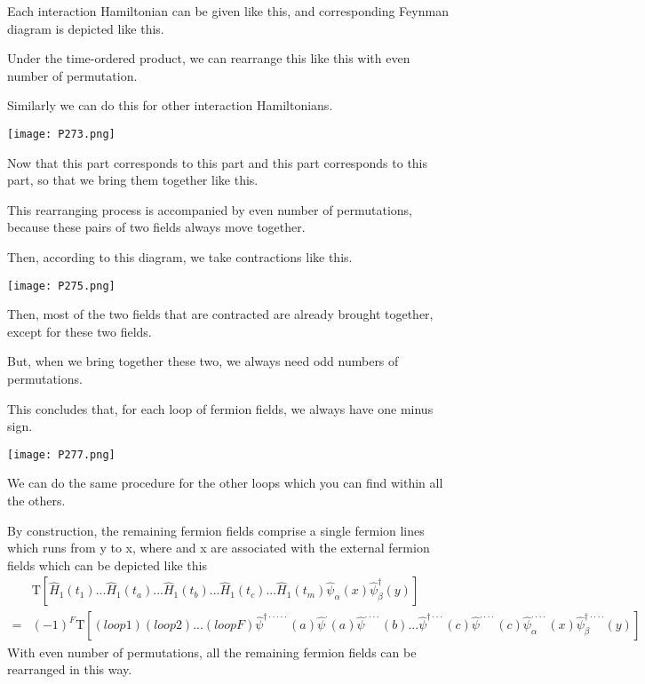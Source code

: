Each interaction Hamiltonian can be given like this, and corresponding Feynman diagram is depicted like this.

Under the time-ordered product, we can rearrange this like this with even number of permutation.

Similarly we can do this for other interaction Hamiltonians.
\begin{center}
\texttt{[image: P273.png]}
\end{center}

Now that this part corresponds to this part and this part corresponds to this part, so that we bring them together like this.

This rearranging process is accompanied by even number of permutations, because these pairs of two fields always move together.

Then, according to this diagram, we take contractions like this.
\begin{center}
\texttt{[image: P275.png]}
\end{center}

Then, most of the two fields that are contracted are already brought together, except for these two fields.

But, when we bring together these two, we always need odd numbers of permutations.

This concludes that, for each loop of fermion fields, we always have one minus sign.
\begin{center}
\texttt{[image: P277.png]}
\end{center}

We can do the same procedure for the other loops which you can find within all the others.

By construction, the remaining fermion fields comprise a single fermion lines which runs from y to x, where and x are associated with the external fermion fields which can be depicted like this
\begin{align}
&\mathrm{T}[\hat H_1(t_1)...\hat H_1(t_a)...\hat H_1(t_b)...\hat H_1(t_c)...\hat H_1(t_m)\hat \psi_{\alpha}(x)\hat \psi_{\beta}^{\dagger}(y)]\nonumber \\
=&(-1)^F\mathrm{T}[(loop1)(loop2)...(loopF)\hat \psi^{\dagger\cdot\cdot\cdot\cdot\cdot}(a)\hat \psi^{\cdot}(a)\hat \psi^{\cdot\cdot\cdot\cdot}(b)...\hat \psi^{\dagger\cdot\cdot\cdot}(c)\hat \psi^{\cdot\cdot\cdot\cdot}(c)\hat \psi_{\alpha}^{\cdot\cdot\cdot\cdot}(x)\hat \psi_{\beta}^{\dagger\cdot\cdot\cdot\cdot}(y)]\nonumber
\end{align}
With even number of permutations, all the remaining fermion fields can be rearranged in this way.

